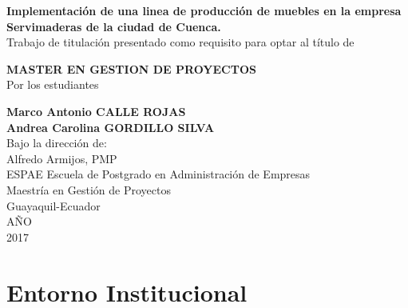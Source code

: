 \documentclass[12pt, a4paper]{article}
\begin{document}
\begin{titlepage}
\begin{center}
\textbf{Implementación de una linea de producción de muebles en la empresa Servimaderas de la ciudad de Cuenca.}\\%
\vspace{0.5cm}
\vspace{3cm}
Trabajo de titulación presentado como requisito para optar al título de \\
\vspace{0.5cm}

\textbf {MASTER EN GESTION DE PROYECTOS}\\

\vspace{2cm}
Por los estudiantes\\
\vspace{0.5cm}

\textbf {Marco Antonio CALLE ROJAS}\\
\vspace{1cm}
\textbf{Andrea Carolina GORDILLO SILVA}\\
\vspace{3cm}
Bajo la dirección de:\\
\vspace{1cm}
Alfredo Armijos, PMP\\
\vspace{3cm}
ESPAE Escuela de Postgrado en Administración de Empresas\\
Maestría en Gestión de Proyectos\\
Guayaquil-Ecuador\\

AÑO\\

2017
\end{center}
\end{titlepage}

\tableofcontents%
\listoftables%
\listoffigures%

\doublespace %
\setlength{\parskip}{\baselineskip}%


\let\olditemize\itemize
\def\itemize{\olditemize\itemsep=0pt }
\newpage

\section {Entorno Institucional}
\end{document}
